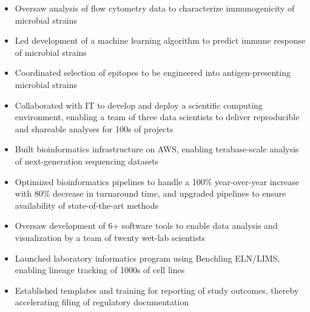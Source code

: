 \documentclass[letterpaper,10pt]{article}
\begin{document}
\begin{itemize}
\begin{itemize}
			\item Oversaw analysis of flow cytometry data to characterize immunogenicity of microbial strains
			\item Led development of a machine learning algorithm to predict immune response of microbial strains
			\item Coordinated selection of epitopes to be engineered into antigen-presenting microbial strains

			\item Collaborated with IT to develop and deploy a scientific computing environment, enabling a team of three data scientists to deliver reproducible and shareable analyses for 100s of projects
			\item Built bioinformatics infrastructure on AWS, enabling terabase-scale analysis of next-generation sequencing datasets
			\item Optimized bioinformatics pipelines to handle a 100\% year-over-year increase with 80\% decrease in turnaround time, and upgraded pipelines to ensure availability of state-of-the-art methods
			\item Oversaw development of 6+ software tools to enable data analysis and visualization by a team of twenty wet-lab scientists
			\item Launched laboratory informatics program using Benchling ELN/LIMS, enabling lineage tracking of 1000s of cell lines
			\item Established templates and training for reporting of study outcomes, thereby accelerating filing of regulatory documentation
		\end{itemize}
		

\end{itemize}
\end{document}
